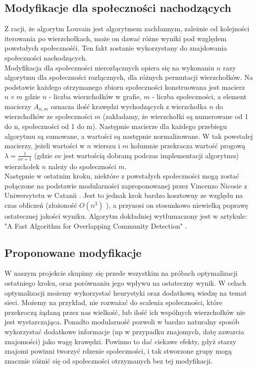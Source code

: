 \documentclass{article}
\begin{document}
\subsection{Modyfikacje dla społeczności nachodzących}
Z racji, że algorytm Louvain jest algorytmem zachłannym, zależnie od kolejności iterowania po wierzchołkach, może on dawać różne wyniki pod względem powstałych społecznośći. Ten fakt zostanie wykorzystany do znajdowania społeczności nachodzących.\\
Modyfikacja dla społeczności nierozłącznych opiera się na wykonaniu $n$ razy algorytmu dla społeczności rozłącznych, dla różnych permutacji wierzchołków. Na podstawie każdego otrzymanego zbioru społeczności konstruowana jest macierz $n \times m$ gdzie $n$ - liczba wierzchołków w grafie, $m$ - liczba społeczności, a element macierzy $A_{n,m}$ oznacza ilość krawędzi wychodzących z wierzchołka $n$ do wierzchołków ze społeczności $m$ (zakładamy, że wierzchołki są numerowane od 1 do n, społeczności od 1 do m). Następnie macierze dla każdego przebiegu algorytmu są sumowane, a wartości są następnie normalizowane. W tak powstałej macierzy, jeżeli wartości w $n$ wierszu i $m$ kolumnie przekracza wartość progową $\lambda = \frac{1}{ov + 1}$ (gdzie $ov$ jest wartością dobraną podczas implementacji algorytmu) wierzchołek $n$ należy do społeczności $m$. \\
Następnie w ostatnim kroku, niektóre z powstałych społeczności mogą zostać połączone na podstawie modularności zaproponowanej przez Vincenzo Nicosie z Uniwersytetu w Catanii \cite{pw-paper2} . Jest to jednak krok bardzo kosztowny ze względu na czas obliczeń (złożoność $O(n^3)$ ), a przynosi on stosunkowo niewielką poprawę ostatecznej jakości wyniku. Algorytm dokładniej wytłumaczony jest w artykule: "A Fast Algorithm for Overlapping Community Detection" \cite{pw-paper3}.
\subsection{Proponowane modyfikacje}
W naszym projekcie skupimy się przede wszystkim na próbach optymalizacji ostatniego kroku, oraz porównaniu jego wpływu na ostateczny wynik. W celach optymalizacji możemy wykorzystać heurystyki oraz dodatkową wiedzę na temat sieci. Możemy na przykład, nie rozważać do scalenia społeczności, które przekroczą żądaną przez nas wielkość, lub ilość ich wspólnych wierzchołków nie jest wystarczająca.
Ponadto modularność pozwoli w bardzo naturalny sposób wykorzystać dodatkowe informacje (np w przypadku znajomych, datę zawarcia znajomości) jako wagę krawędzi. Powinno to dać ciekawe efekty, gdyż starzy znajomi powinni tworzyć rdzenie społeczności, i tak stworzone grupy mogą znacznie różnić się od społeczności otrzymanych bez tej modyfikacji.\\
\end{document}
